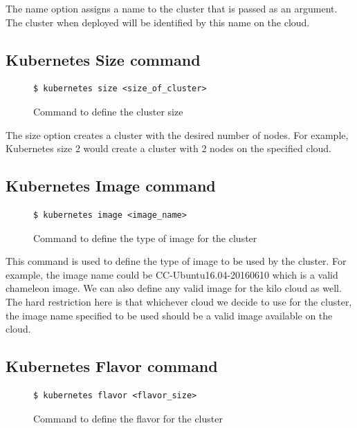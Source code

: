 \documentclass[9pt,twocolumn,twoside]{../../styles/osajnl}
\begin{document}
The name option assigns a name to the cluster that is passed as an
argument. The cluster when deployed will be identified by this name on the
cloud.
\subsection{Kubernetes Size command}

\begin{figure}[H]
\begin{verbatim}
$ kubernetes size <size_of_cluster>
\end{verbatim}
\caption{Command to define the cluster size}
\vspace{-4mm}
\label{Command to define the cluster size}
\end{figure}

The size option creates a cluster with the desired number of
nodes. For example, Kubernetes size 2 would create a cluster with 2
nodes on the specified cloud.

\subsection{Kubernetes Image command}
\begin{figure}[H]
\begin{verbatim}
$ kubernetes image <image_name>
\end{verbatim}
\caption{Command to define the type of image for the cluster}
\vspace{-4mm}
\label{Command to define the type of image for the cluster}
\end{figure}

This command is used to define the type of image to be used by the
cluster. For example, the image name could be CC-Ubuntu16.04-20160610
which is a valid chameleon image. We can also define any valid image
for the kilo cloud as well. The hard restriction here is that
whichever cloud we decide to use for the cluster, the image name
specified to be used should be a valid image available on the cloud.

\subsection{Kubernetes Flavor command}
\begin{figure}[H]
\begin{verbatim}
$ kubernetes flavor <flavor_size>
\end{verbatim}
\caption{Command to define the flavor for the cluster}
\vspace{-4mm}
\label{Command to define the flavor for the cluster}
\end{figure}
\end{document}
